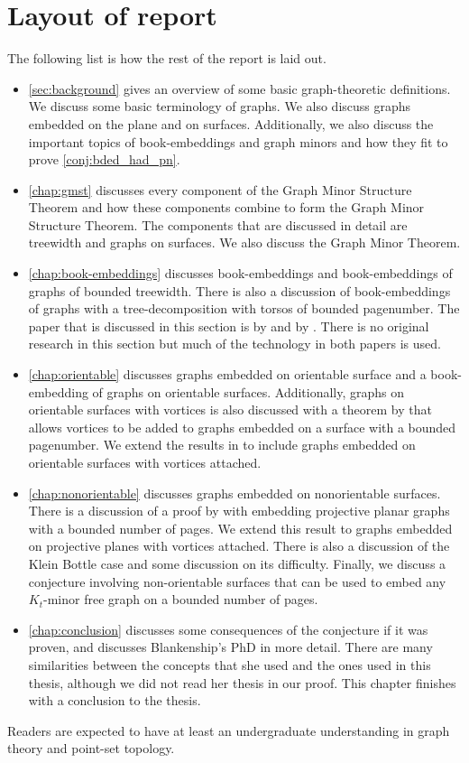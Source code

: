 \section{Layout of report}
The following list is how the rest of the report is laid out. 
\begin{itemize}
	\item \cref{sec:background} gives an overview of some basic graph-theoretic definitions. We discuss some basic terminology of graphs. We also discuss graphs embedded on the plane and on surfaces. Additionally, we also discuss the important topics of book-embeddings and graph minors and how they fit to prove \cref{conj:bded_had_pn}. 
	\item \cref{chap:gmst} discusses every component of the Graph Minor Structure Theorem and how these components combine to form the Graph Minor Structure Theorem. The components that are discussed in detail are treewidth and graphs on surfaces. We also discuss the Graph Minor Theorem. 
	\item \cref{chap:book-embeddings} discusses book-embeddings and book-embeddings of graphs of bounded treewidth. There is also a discussion of book-embeddings of graphs with a tree-decomposition with torsos of bounded pagenumber. The paper that is discussed in this section is by \textcite{hickingbothamStackNumberCliqueSum2023} and by \textcite{ganleyPagenumberTrees2001}. There is no original research in this section but much of the technology in both papers is used. 
	\item \cref{chap:orientable} discusses graphs embedded on orientable surface and a book-embedding of graphs on orientable surfaces. Additionally, graphs on orientable surfaces with vortices is also discussed with a theorem by \textcite{heathPagenumberGenusGraphs1992} that allows vortices to be added to graphs embedded on a surface with a bounded pagenumber.  We extend the results in \textcite{heathPagenumberGenusGraphs1992} to include graphs embedded on orientable surfaces with vortices attached. 
	\item \cref{chap:nonorientable} discusses graphs embedded on nonorientable surfaces. There is a discussion of a proof by \textcite{nakamotoBookEmbeddingProjectiveplanar2015} with embedding projective planar graphs with a bounded number of pages. We extend this result to graphs embedded on projective planes with vortices attached. There is also a discussion of the Klein Bottle case and some discussion on its difficulty. Finally, we discuss a conjecture involving non-orientable surfaces that can be used to embed any $K_t$-minor free graph on a bounded number of pages. 
	\item \cref{chap:conclusion} discusses some consequences of the conjecture if it was proven, and discusses Blankenship's PhD in more detail. There are many similarities between the concepts that she used and the ones used in this thesis, although we did not read her thesis in our proof. This chapter finishes with a conclusion to the thesis. 
\end{itemize}

Readers are expected to have at least an undergraduate understanding in graph theory and point-set topology. 
